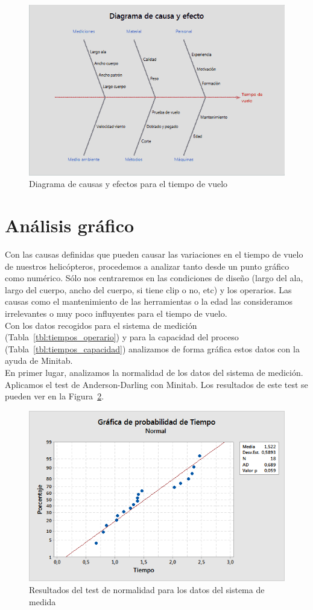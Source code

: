 \documentclass[12pt,a4paper,twoside,openright,titlepage,final]{article}
\begin{document}
\begin{figure}[htbp!]
	\centering
	\includegraphics[width=0.7\linewidth]{imagenes/Diagrama_de_causa_y_efecto}
	\caption{Diagrama de causas y efectos para el tiempo de vuelo}
	\label{fig:causa_efecto}
\end{figure}


\section{Análisis gráfico}

Con las causas definidas que pueden causar las variaciones en el tiempo de vuelo de nuestros helicópteros, procedemos a analizar tanto desde un punto gráfico como numérico. Sólo nos centraremos en las condiciones de diseño (largo del ala, largo del cuerpo, ancho del cuerpo, si tiene clip o no, etc) y los operarios. Las causas como el mantenimiento de las herramientas o la edad las consideramos irrelevantes o muy poco influyentes para el tiempo de vuelo.\\

Con los datos recogidos para el sistema de medición (Tabla~\ref{tbl:tiempos_operario}) y para la capacidad del proceso (Tabla~\ref{tbl:tiempos_capacidad}) analizamos de forma gráfica estos datos con la ayuda de Minitab.\\

En primer lugar, analizamos la normalidad de los datos del sistema de medición. Aplicamos el test de Anderson-Darling con Minitab. Los resultados de este test se pueden ver en la Figura~\ref{fig:normalidad_rr}.\\

\begin{figure}[htbp!]
	\centering
	\includegraphics[width=0.7\linewidth]{imagenes/Grafica_de_normalidad_de_Tiempo_(datos_RR)}
	\caption{Resultados del test de normalidad para los datos del sistema de medida}
	\label{fig:normalidad_rr}
\end{figure}
\end{document}
